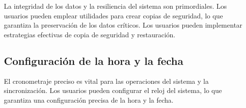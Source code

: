 \documentclass[a4paper]{article} %
\begin{document}
La integridad de los datos y la resiliencia del sistema son primordiales. Los usuarios pueden emplear utilidades para crear copias de seguridad, lo que garantiza la preservación de los datos críticos. Los usuarios pueden implementar estrategias efectivas de copia de seguridad y restauración.

\subsection{Configuración de la hora y la fecha}

El cronometraje preciso es vital para las operaciones del sistema y la sincronización. Los usuarios pueden configurar el reloj del sistema, lo que garantiza una configuración precisa de la hora y la fecha.

\cite{sistemaOperativoWiki}
% 
% 

\newpage
\printbibliography
\end{document}
